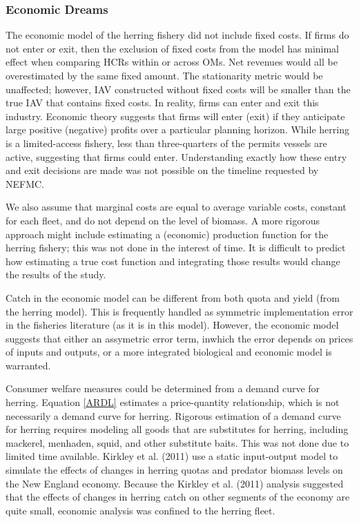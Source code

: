 \documentclass[]{article}
\begin{document}
\subsubsection{Economic Dreams}\label{economic-dreams}

The economic model of the herring fishery did not include fixed costs.
If firms do not enter or exit, then the exclusion of fixed costs from
the model has minimal effect when comparing HCRs within or across OMs.
Net revenues would all be overestimated by the same fixed amount. The
stationarity metric would be unaffected; however, IAV constructed
without fixed costs will be smaller than the true IAV that contains
fixed costs. In reality, firms can enter and exit this industry.
Economic theory suggests that firms will enter (exit) if they anticipate
large positive (negative) profits over a particular planning horizon.
While herring is a limited-access fishery, less than three-quarters of
the permits vessels are active, suggesting that firms could enter.
Understanding exactly how these entry and exit decisions are made was
not possible on the timeline requested by NEFMC.

We also assume that marginal costs are equal to average variable costs,
constant for each fleet, and do not depend on the level of biomass. A
more rigorous approach might include estimating a (economic) production
function for the herring fishery; this was not done in the interest of
time. It is difficult to predict how estimating a true cost function and
integrating those results would change the results of the study.

Catch in the economic model can be different from both quota and yield
(from the herring model). This is frequently handled as symmetric
implementation error in the fisheries literature (as it is in this
model). However, the economic model suggests that either an assymetric
error term, inwhich the error depends on prices of inputs and outputs,
or a more integrated biological and economic model is warranted.

Consumer welfare measures could be determined from a demand curve for
herring. Equation \ref{ARDL} estimates a price-quantity relationship,
which is not necessarily a demand curve for herring. Rigorous estimation
of a demand curve for herring requires modeling all goods that are
substitutes for herring, including mackerel, menhaden, squid, and other
substitute baits. This was not done due to limited time available.
Kirkley et al. (2011) use a static input-output model to simulate the
effects of changes in herring quotas and predator biomass levels on the
New England economy. Because the Kirkley et al. (2011) analysis
suggested that the effects of changes in herring catch on other segments
of the economy are quite small, economic analysis was confined to the
herring fleet.
\end{document}
